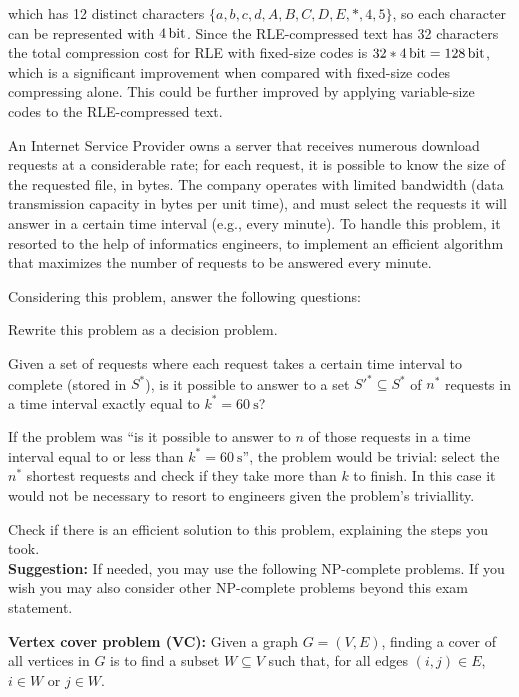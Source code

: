\documentclass{cal}
\begin{document}
{which has 12 distinct characters $\{a, b, c, d, A, B, C, D, E, *, 4, 5\}$, so each character can be represented with $\SI{4}{\bit}$. Since the RLE-compressed text has 32 characters the total compression cost for RLE with fixed-size codes is $32*\SI{4}{\bit} = \SI{128}{\bit}$, which is a significant improvement when compared with fixed-size codes compressing alone. This could be further improved by applying variable-size codes to the RLE-compressed text.

An Internet Service Provider owns a server that receives numerous download requests at a considerable rate; for each request, it is possible to know the size of the requested file, in bytes. The company operates with limited bandwidth (data transmission capacity in bytes per unit time), and must select the requests it will answer in a certain time interval (e.g., every minute). To handle this problem, it resorted to the help of informatics engineers, to implement an efficient algorithm that maximizes the number of requests to be answered every minute.

Considering this problem, answer the following questions:

Rewrite this problem as a decision problem.

\ansseparator

Given a set of requests where each request takes a certain time interval to complete (stored in $S^*$), is it possible to answer to a set $S'^* \subseteq S^*$ of $n^*$ requests in a time interval exactly equal to $k^* = \SI{60}{\second}$?

\remark If the problem was ``is it possible to answer to $n$ of those requests in a time interval equal to or less than $k^* = \SI{60}{\second}$'', the problem would be trivial: select the $n^*$ shortest requests and check if they take more than $k$ to finish. In this case it would not be necessary to resort to engineers given the problem's triviallity.

Check if there is an efficient solution to this problem, explaining the steps you took.\\

\textbf{Suggestion: } If needed, you may use the following NP-complete problems. If you wish you may also consider other NP-complete problems beyond this exam statement.

\textbf{Vertex cover problem (VC): } Given a graph $G=(V,E)$, finding a cover of all vertices in $G$ is to find a subset $W \subseteq V$ such that, for all edges $(i,j) \in E$, $i \in W$ or $j \in W$.

}
\end{document}
